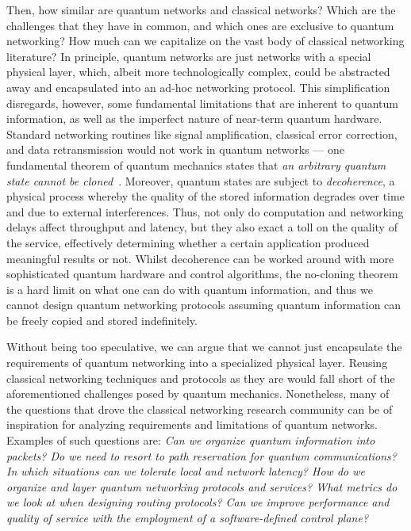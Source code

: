 Then, how similar are quantum networks and classical networks? Which are the challenges that they
have in common, and which ones are exclusive to quantum networking? How much can we capitalize on
the vast body of classical networking literature? In principle, quantum networks are just networks
with a special physical layer, which, albeit more technologically complex, could be abstracted away
and encapsulated into an ad-hoc networking protocol. This simplification disregards, however,
some fundamental limitations that are inherent to quantum information, as well as the imperfect
nature of near-term quantum hardware. Standard networking routines like signal amplification,
classical error correction, and data retransmission would not work in quantum networks --- one
fundamental theorem of quantum mechanics states that \emph{an arbitrary quantum state cannot be
cloned}~\cite{wootters_1982_nocloning, dieks_1982_communication}. Moreover, quantum states are
subject to \emph{decoherence}, a physical process whereby the quality of the stored information
degrades over time and due to external interferences. Thus, not only do computation and networking
delays affect throughput and latency, but they also exact a toll on the quality of the service,
effectively determining whether a certain application produced meaningful results or not. Whilst
decoherence can be worked around with more sophisticated quantum hardware and control algorithms,
the no-cloning theorem is a hard limit on what one can do with quantum information, and thus we
cannot design quantum networking protocols assuming quantum information can be freely copied and
stored indefinitely.

Without being too speculative, we can argue that we cannot just encapsulate the requirements of
quantum networking into a specialized physical layer. Reusing classical networking techniques and
protocols as they are would fall short of the aforementioned challenges posed by quantum mechanics.
Nonetheless, many of the questions that drove the classical networking research community can be of
inspiration for analyzing requirements and limitations of quantum networks. Examples of such
questions are: \emph{Can we organize quantum information into packets? Do we need to resort to path
reservation for quantum communications? In which situations can we tolerate local and network
latency? How do we organize and layer quantum networking protocols and services? What metrics do we
look at when designing routing protocols? Can we improve performance and quality of service with the
employment of a software-defined control plane?}

